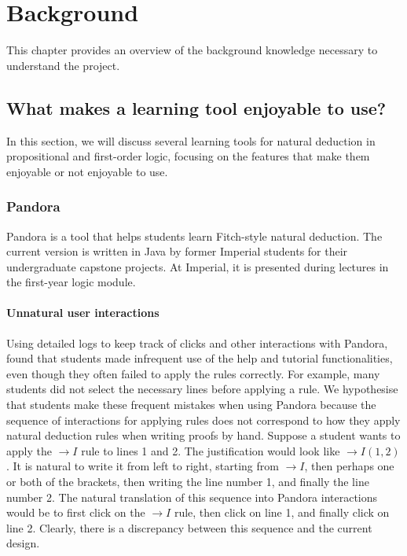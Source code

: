 \chapter{Background}\label{background}
This chapter provides an overview of the background knowledge necessary to understand the project.




\section{What makes a learning tool enjoyable to use?}\label{background:enjoyable}
In this section, we will discuss several learning tools for natural deduction in propositional and first-order logic, focusing on the features that make them enjoyable or not enjoyable to use.

\subsection{Pandora}
Pandora \cite{pandora:2007} is a tool that helps students learn Fitch-style natural deduction. The current version \cite{pandora} is written in Java by former Imperial students for their undergraduate capstone projects. At Imperial, it is presented during lectures in the first-year logic module.

\subsubsection{Unnatural user interactions}
Using detailed logs to keep track of clicks and other interactions with Pandora, \cite{pandora:2007} found that students made infrequent use of the help and tutorial functionalities, even though they often failed to apply the rules correctly. For example, many students did not select the necessary lines before applying a rule. We hypothesise that students make these frequent mistakes when using Pandora because the sequence of interactions for applying rules does not correspond to how they apply natural deduction rules when writing proofs by hand. Suppose a student wants to apply the $\rightarrow I$ rule to lines 1 and 2. The justification would look like $\rightarrow I(1, 2)$. It is natural to write it from left to right, starting from $\rightarrow I$, then perhaps one or both of the brackets, then writing the line number 1, and finally the line number 2. The natural translation of this sequence into Pandora interactions would be to first click on the $\rightarrow I$ rule, then click on line 1, and finally click on line 2. Clearly, there is a discrepancy between this sequence and the current design.

